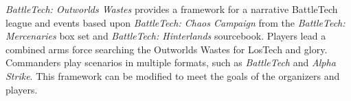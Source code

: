 \emph{BattleTech: Outworlds Wastes} provides a framework for a narrative BattleTech league and events based upon \emph{BattleTech: Chaos Campaign} from the \emph{BattleTech: Mercenaries} box set and \emph{BattleTech: Hinterlands} sourcebook.
Players lead a combined arms force searching the Outworlds Wastes for LosTech and glory.
Commanders play scenarios in multiple formats, such as \emph{BattleTech} and \emph{Alpha Strike}.
This framework can be modified to meet the goals of the organizers and players.
